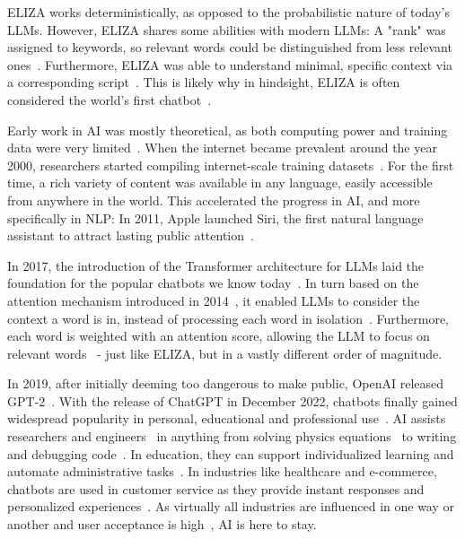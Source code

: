ELIZA works deterministically, as opposed to the probabilistic nature of today's \glspl{LLM}. However, ELIZA shares some abilities with modern \glspl{LLM}: A "rank" was assigned to keywords, so relevant words could be distinguished from less relevant ones~\cite{weizenbaumELIZAComputerProgram1966}. Furthermore, ELIZA was able to understand minimal, specific context via a corresponding script~\cite{weizenbaumELIZAComputerProgram1966}. This is likely why in hindsight, ELIZA is often considered the world's first chatbot~\cite{berryLimitsComputationJoseph2023,shragerELIZAReinterpretedWorlds2024,wangELIZAChatGPTBrief2024}.

Early work in \gls{AI} was mostly theoretical, as both computing power and training data were very limited~\cite{shragerELIZAReinterpretedWorlds2024}. When the internet became prevalent around the year 2000, researchers started compiling internet-scale training datasets~\cite{bankoScalingVeryVery2001,resnikWebParallelCorpus2003,kilgarriffIntroductionSpecialIssue2003}. For the first time, a rich variety of content was available in any language, easily accessible from anywhere in the world. This accelerated the progress in \gls{AI}, and more specifically in \gls{NLP}: In 2011, Apple launched Siri, the first natural language assistant to attract lasting public attention~\cite{wangELIZAChatGPTBrief2024}.

In 2017, the introduction of the Transformer architecture for \glspl{LLM} laid the foundation for the popular chatbots we know today~\cite{vaswaniAttentionAllYou2023}. In turn based on the attention mechanism introduced in 2014~\cite{bahdanauNeuralMachineTranslation2016}, it enabled \glspl{LLM} to consider the context a word is in, instead of processing each word in isolation~\cite{vaswaniAttentionAllYou2023,bahdanauNeuralMachineTranslation2016}. Furthermore, each word is weighted with an attention score, allowing the \gls{LLM} to focus on relevant words~\cite{vaswaniAttentionAllYou2023,bahdanauNeuralMachineTranslation2016} - just like ELIZA, but in a vastly different order of magnitude.

In 2019, after initially deeming too dangerous to make public, OpenAI released GPT-2~\cite{hernNewAIFake2019}. With the release of ChatGPT in December 2022, chatbots finally gained widespread popularity in personal, educational and professional use~\cite{wuUnveilingSecurityPrivacy2024}. \gls{AI} assists researchers and engineers~\cite{schmidgallAgentLaboratoryUsing2025} in anything from solving physics equations~\cite{panQuantumManybodyPhysics2025,songLLMFeynmanLeveragingLarge2025} to writing and debugging code~\cite{shiCodeCorrectnessClosing2024,tianDebugBenchEvaluatingDebugging2024,leeUnifiedDebuggingApproach2024,leeGitHubRecentBugs2024}. In education, they can support individualized learning and automate administrative tasks~\cite{mienyeChatGPTEducationReview2025}. In industries like healthcare and e-commerce, chatbots are used in customer service as they provide instant responses and personalized experiences~\cite{wangELIZAChatGPTBrief2024}. As virtually all industries are influenced in one way or another and user acceptance is high~\cite{wangHistoryDevelopmentPrinciples2024,wangELIZAChatGPTBrief2024}, \gls{AI} is here to stay.

